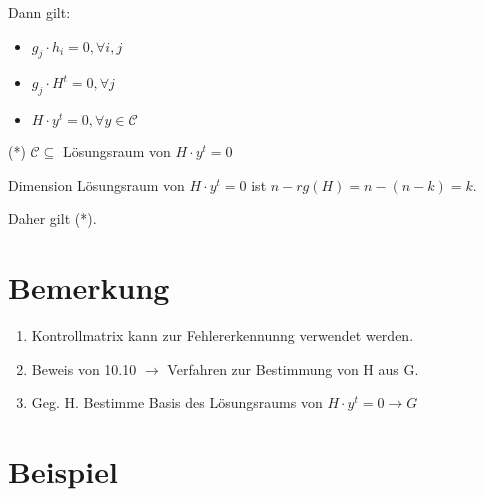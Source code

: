   Dann gilt:

  \begin{itemize}
    \item $g_j \cdot h_i = 0, \forall i,j$

    \item $g_j \cdot H^t = 0, \forall j$

    \item $H \cdot y^t = 0, \forall y \in \mathcal{C}$
  \end{itemize}

  (*) $\mathcal{C} \subseteq$ Lösungsraum von $H \cdot y^t = 0$

  Dimension Lösungsraum von $H \cdot y^t = 0$ ist $n - rg(H) = n-(n-k) = k$.

  \par \medskip

  Daher gilt (*).

  \section{Bemerkung}

  \begin{enumerate}[label=(\alph*)]
    \item Kontrollmatrix kann zur Fehlererkennunng verwendet werden.

    \item Beweis von 10.10 $\rightarrow$ Verfahren zur Bestimmung von H aus G.

    \item Geg. H. Bestimme Basis des Lösungsraums von $H \cdot y^t = 0 \rightarrow G$
  \end{enumerate}

  \section{Beispiel}


